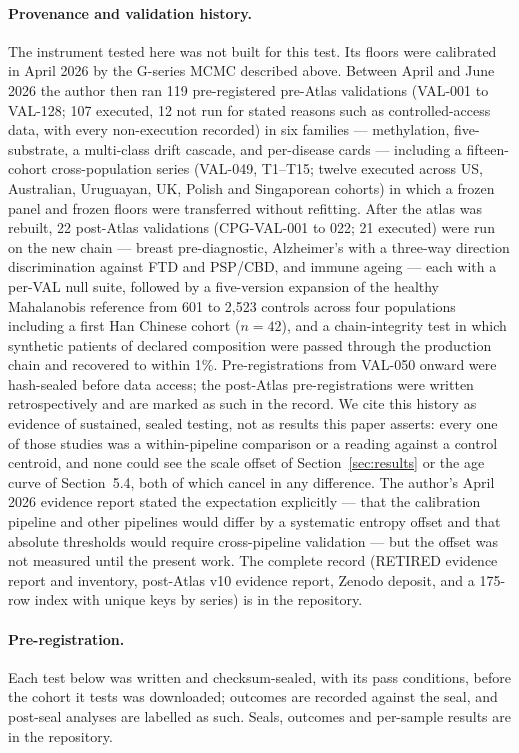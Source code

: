 \documentclass[12pt,a4paper]{article}
\begin{document}
\paragraph{Provenance and validation history.}
The instrument tested here was not built for this test. Its floors were calibrated in April 2026 by the G-series MCMC described above. Between April and June 2026 the author then ran 119 pre-registered pre-Atlas validations (VAL-001 to VAL-128; 107 executed, 12 not run for stated reasons such as controlled-access data, with every non-execution recorded) in six families --- methylation, five-substrate, a multi-class drift cascade, and per-disease cards --- including a fifteen-cohort cross-population series (VAL-049, T1--T15; twelve executed across US, Australian, Uruguayan, UK, Polish and Singaporean cohorts) in which a frozen panel and frozen floors were transferred without refitting. After the atlas was rebuilt, 22 post-Atlas validations (CPG-VAL-001 to 022; 21 executed) were run on the new chain --- breast pre-diagnostic, Alzheimer's with a three-way direction discrimination against FTD and PSP/CBD, and immune ageing --- each with a per-VAL null suite, followed by a five-version expansion of the healthy Mahalanobis reference from 601 to 2,523 controls across four populations including a first Han Chinese cohort ($n = 42$), and a chain-integrity test in which synthetic patients of declared composition were passed through the production chain and recovered to within 1\%. Pre-registrations from VAL-050 onward were hash-sealed before data access; the post-Atlas pre-registrations were written retrospectively and are marked as such in the record. We cite this history as evidence of sustained, sealed testing, not as results this paper asserts: every one of those studies was a within-pipeline comparison or a reading against a control centroid, and none could see the scale offset of Section~\ref{sec:results} or the age curve of Section~5.4, both of which cancel in any difference. The author's April 2026 evidence report \citep{mahaffey2026zenodo} stated the expectation explicitly --- that the calibration pipeline and other pipelines would differ by a systematic entropy offset and that absolute thresholds would require cross-pipeline validation --- but the offset was not measured until the present work. The complete record (RETIRED evidence report and inventory, post-Atlas v10 evidence report, Zenodo deposit, and a 175-row index with unique keys by series) is in the repository.

\paragraph{Pre-registration.} Each test below was written and checksum-sealed, with its pass conditions, before the cohort it tests was downloaded; outcomes are recorded against the seal, and post-seal analyses are labelled as such. Seals, outcomes and per-sample results are in the repository.
\end{document}
